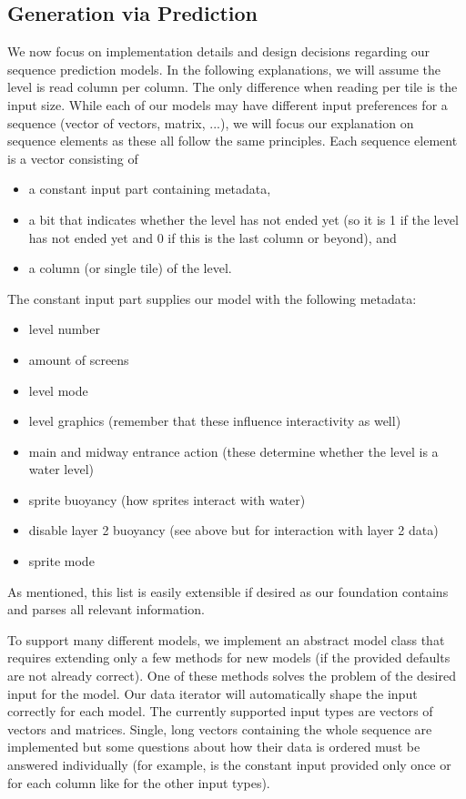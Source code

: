 \subsection{Generation via Prediction}
\label{sec:generation-via-prediction}

We now focus on implementation details and design decisions regarding
our sequence prediction models. In the following explanations, we will
assume the level is read column per column. The only difference when
reading per tile is the input size. While each of our models may have
different input preferences for a sequence (vector of vectors, matrix,
...), we will focus our explanation on sequence elements as these all
follow the same principles. Each sequence element is a vector
consisting of
\begin{itemize}
\item a constant input part containing metadata,
\item a bit that indicates whether the level has not ended yet (so it
  is 1 if the level has not ended yet and 0 if this is the last column
  or beyond), and
\item a column (or single tile) of the level.
\end{itemize}
The constant input part supplies our model with the following
metadata:
\begin{itemize}
\item level number
\item amount of screens
\item level mode
\item level graphics (remember that these influence interactivity as well)
\item main and midway entrance action (these determine whether the
  level is a water level)
\item sprite buoyancy (how sprites interact with water)
\item disable layer 2 buoyancy (see above but for interaction with layer 2 data)
\item sprite mode
\end{itemize}
As mentioned, this list is easily extensible if desired as our
foundation contains and parses all relevant information.

To support many different models, we implement an abstract model class
that requires extending only a few methods for new models (if the
provided defaults are not already correct). One of these methods
solves the problem of the desired input for the model. Our data
iterator will automatically shape the input correctly for each model.
The currently supported input types are vectors of vectors and
matrices. Single, long vectors containing the whole sequence are
implemented but some questions about how their data is ordered must be
answered individually (for example, is the constant input provided
only once or for each column like for the other input types).

